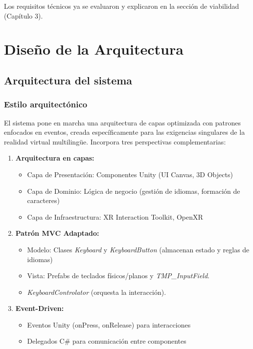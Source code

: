 Los requisitos técnicos ya se evaluaron y explicaron en la sección de viabilidad (Capítulo 3).

\section{Diseño de la Arquitectura}
\subsection{Arquitectura del sistema}
\subsubsection{Estilo arquitectónico}

El sistema pone en marcha una arquitectura de capas optimizada con patrones enfocados en eventos, creada específicamente para las exigencias singulares de la realidad virtual multilingüe. Incorpora tres perspectivas complementarias:

\begin{enumerate}
	\item \textbf{Arquitectura en capas:}
	\begin{itemize}
		\item Capa de Presentación: Componentes Unity (UI Canvas, 3D Objects)
		\item Capa de Dominio: Lógica de negocio (gestión de idiomas, formación de caracteres)
		\item Capa de Infraestructura: XR Interaction Toolkit, OpenXR
	\end{itemize}
	\item \textbf{Patrón MVC Adaptado:}
	\begin{itemize}
		\item Modelo: Clases \textit{Keyboard} y \textit{KeyboardButton} (almacenan estado y reglas de idiomas)
		\item Vista: Prefabs de teclados físicos/planos y \textit{TMP\_InputField}.
		\item \textit{KeyboardControlator} (orquesta la interacción).
	\end{itemize}
	\item \textbf{Event-Driven:}
	\begin{itemize}
		\item Eventos Unity (onPress, onRelease) para interacciones
		\item Delegados C\# para comunicación entre componentes
	\end{itemize}
\end{enumerate}


